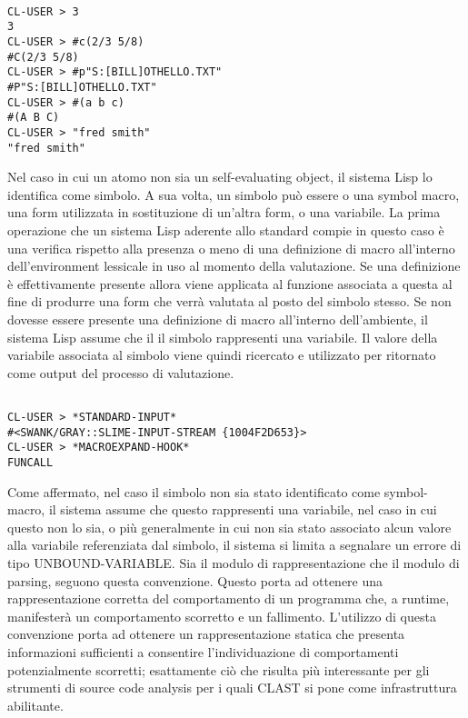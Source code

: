 \begin{lstlisting}[caption=Esempi di form di tipo self-evaluating object]

CL-USER > 3
3
CL-USER > #c(2/3 5/8)
#C(2/3 5/8)
CL-USER > #p"S:[BILL]OTHELLO.TXT"
#P"S:[BILL]OTHELLO.TXT"
CL-USER > #(a b c)
#(A B C)
CL-USER > "fred smith"
"fred smith"

\end{lstlisting}

Nel caso in cui un atomo non sia un self-evaluating object, il sistema Lisp lo
identifica come simbolo. A sua volta, un simbolo può essere o una symbol
macro, una form utilizzata in sostituzione di un’altra form, o una variabile.
La prima operazione che un sistema Lisp aderente allo standard compie in
questo caso è una verifica rispetto alla presenza o meno di una definizione di
macro all’interno dell’environment lessicale in uso al momento della
valutazione. Se una definizione è effettivamente presente allora viene
applicata al funzione associata a questa al fine di produrre una form che
verrà valutata al posto del simbolo stesso. Se non dovesse essere presente una
definizione di macro all’interno dell’ambiente, il sistema Lisp assume che il
il simbolo rappresenti una variabile. Il valore della variabile associata al
simbolo viene quindi ricercato e utilizzato per ritornato come output del
processo di valutazione.\\

\begin{lstlisting}[caption=Esempi di form di tipo symbol]

CL-USER > *STANDARD-INPUT*
#<SWANK/GRAY::SLIME-INPUT-STREAM {1004F2D653}>
CL-USER > *MACROEXPAND-HOOK*
FUNCALL

\end{lstlisting}

Come affermato, nel caso il simbolo non sia stato identificato come symbol-
macro, il sistema assume che questo rappresenti una variabile, nel caso in cui
questo non lo sia, o più generalmente in cui non sia stato associato alcun
valore alla variabile referenziata dal simbolo, il sistema si limita a
segnalare un errore di tipo UNBOUND-VARIABLE. Sia il modulo di
rappresentazione che il modulo di parsing, seguono questa convenzione. Questo
porta ad ottenere una rappresentazione corretta del comportamento di un
programma che, a runtime, manifesterà un comportamento scorretto e un
fallimento. L’utilizzo di questa convenzione porta ad ottenere un
rappresentazione statica che presenta informazioni sufficienti a consentire
l’individuazione di comportamenti potenzialmente scorretti; esattamente ciò
che risulta più interessante per gli strumenti di source code analysis per i
quali CLAST si pone come infrastruttura abilitante.\\

